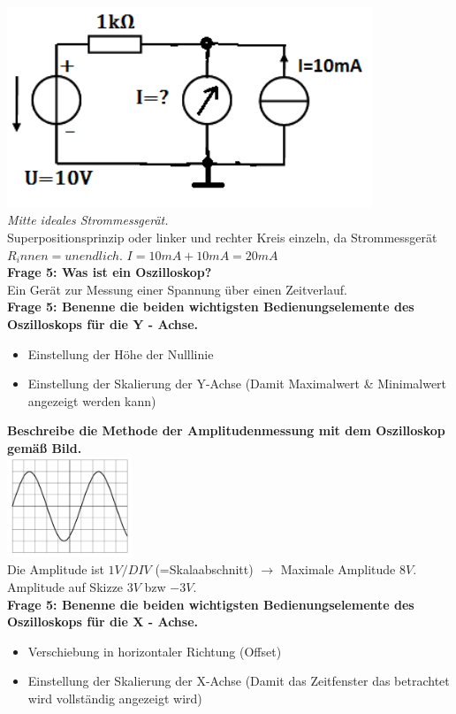 \documentclass[11pt,a4paper]{scrartcl}
\begin{document}
\includegraphics[height=6cm,keepaspectratio]{Strom_berechnen.png}\\
\textit{Mitte ideales Strommessgerät.}\\
Superpositionsprinzip oder linker und rechter Kreis einzeln, da Strommessgerät $R_innen=unendlich$. $I=10mA+10mA=20mA$\\
\textbf{Frage 5: Was ist ein Oszilloskop?}\\
Ein Gerät zur Messung einer Spannung über einen Zeitverlauf.\\
\textbf{Frage 5: Benenne die beiden wichtigsten Bedienungselemente des Oszilloskops für die Y - Achse.}\\
\begin{itemize}
	\item Einstellung der Höhe der Nulllinie
	\item Einstellung der Skalierung der Y-Achse (Damit Maximalwert \& Minimalwert angezeigt werden kann)
\end{itemize}
\textbf{Beschreibe die Methode der Amplitudenmessung mit dem Oszilloskop gemäß Bild.}\\
\includegraphics[height=3cm,keepaspectratio]{Oszi.png}\\
Die Amplitude ist $1V/DIV$ (=Skalaabschnitt) $\rightarrow$ Maximale Amplitude $8V$. Amplitude auf Skizze $3V$ bzw $-3V$.\\
\textbf{Frage 5: Benenne die beiden wichtigsten Bedienungselemente des Oszilloskops für die X - Achse.}\\
\begin{itemize}
	\item Verschiebung in horizontaler Richtung (Offset)
	\item Einstellung der Skalierung der X-Achse (Damit das Zeitfenster das betrachtet wird vollständig angezeigt wird)
\end{itemize}
\end{document}
